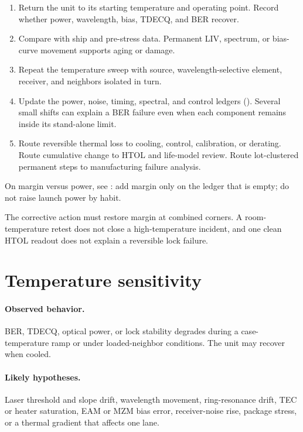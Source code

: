 \begin{enumerate}
\item Return the unit to its starting temperature and operating point. Record
      whether power, wavelength, bias, TDECQ, and BER recover.
\item Compare with ship and pre-stress data. Permanent LIV, spectrum, or bias-curve
      movement supports aging or damage.
\item Repeat the temperature sweep with source, wavelength-selective element,
      receiver, and neighbors isolated in turn.
\item Update the power, noise, timing, spectral, and control ledgers
      (). Several small shifts can explain a BER
      failure even when each component remains inside its stand-alone limit.
\item Route reversible thermal loss to cooling, control, calibration, or derating.
      Route cumulative change to HTOL and life-model review. Route lot-clustered
      permanent steps to manufacturing failure analysis.
\end{enumerate}

On margin versus power, see : add margin only on
the ledger that is empty; do not raise launch power by habit.

The corrective action must restore margin at combined corners. A room-temperature
retest does not close a high-temperature incident, and one clean HTOL readout does
not explain a reversible lock failure.

\section{Temperature sensitivity}
\label{sec:fm-temperature}

\paragraph{Observed behavior.}
BER, TDECQ, optical power, or lock stability degrades during a case-temperature
ramp or under loaded-neighbor conditions. The unit may recover when cooled.

\paragraph{Likely hypotheses.}
Laser threshold and slope drift, wavelength movement, ring-resonance drift, TEC or
heater saturation, EAM or MZM bias error, receiver-noise rise, package stress, or a
thermal gradient that affects one lane.

